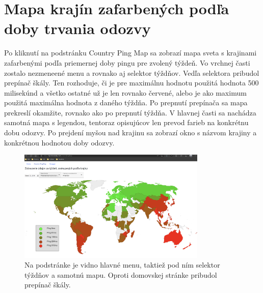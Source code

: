 \section{Mapa krajín zafarbených podľa doby trvania odozvy}

Po kliknutí na podstránku Country Ping Map sa zobrazí mapa sveta s krajinami zafarbenými podľa priemernej doby pingu pre zvolený týždeň. Vo vrchnej časti 
zostalo nezmeneené menu a rovnako aj selektor týždňov. Vedľa selektora pribudol prepínač škály. Ten rozhoduje, či je pre maximálnu hodnotu použitá hodnota 
500 milisekúnd a všetko ostatné už je len rovnako červené, alebo je ako maximum použitá maximálna hodnota z daného týždňa. Po prepnutí prepínača sa mapa 
prekreslí okamžite, rovnako ako po prepnutí týždňa. V hlavnej časti sa nachádza samotná mapa s legendou, tentoraz opisujúcov len prevod farieb na konkrétnu 
dobu odozvy. Po prejdení myšou nad krajinu sa zobrazí okno s názvom krajiny a konkrétnou hodnotou doby odozvy.
\begin{figure}
    \centerline{\includegraphics[width=0.8\textwidth]{images/country-ping-info}}
    \caption[Mapa krajín zafarbených podľa priemernej doby odozvy]{Na podstránke je vidno hlavné menu, taktiež pod ním selektor týždňov a samotnú mapu. Oproti 
    domovskej stránke pribudol prepínač škály. }
    \label{obr:country-ping-info}
\end{figure}
